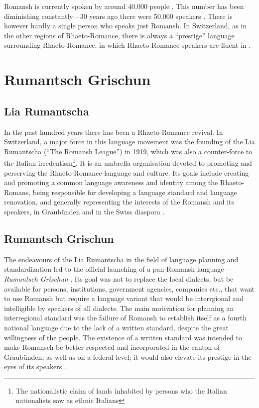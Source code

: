 Romansh is currently spoken by around 40,000 people \autocite{bundesamt2020}. 
This number has been diminishing constantly---30 years ago there were 50,000 speakers \autocite{haiman1992}. 
There is however hardly a single person who speaks just Romansh. 
In Switzerland, as in the other regions of Rhaeto-Romance, there is always a \enquote{prestige} language surrounding Rhaeto-Romance, in which Rhaeto-Romance speakers are fluent in \autocite[3]{haiman1992}. 

\section{Rumantsch Grischun}
\subsection{Lia Rumantscha}
In the past hundred years there has been a Rhaeto-Romance revival. 
In Switzerland, a major force in this language movement was the founding of the Lia Rumantscha (\enquote{The Romansh League}) in 1919, which was also a counter-force to the Italian irredentism\footnote{The nationalistic claim of lands inhabited by persons who the Italian nationalists saw as ethnic Italians}. 
It is an umbrella organisation devoted to promoting and perserving the Rhaeto-Romance language and culture. Its goals include creating and promoting a common language awareness and identity among the Rhaeto-Romans, being responsible for developing a language standard and language renovation, and generally representing the interests of the Romansh and its speakers, in Graubünden and in the Swiss diaspora \autocite{dazzi2012}.

\subsection{Rumantsch Grischun}
The endeavours of the Lia Rumantscha in the field of language planning and standardization led to the official launching of a pan-Romansh language---\emph{Rumantsch Grischun} \autocite[5]{haiman1992}. 
Its goal was not to replace the local dialects, but be available for persons, institutions, government agencies, companies etc., that want to use Romansh but require a language variant that would be interrgional and intelligible by speakers of all dialects. The main motivation for planning an interregional standard was the failure of Romansh to establish itself as a fourth national language due to the lack of a written standard, despite the great willingness of the people.
The existence of a written standard was intended to make Romansch be better respected and incorporated in the canton of Graubünden, as well as on a federal level; it would also elevate its prestige in the eyes of its speakers \autocite{schmid1982}.

